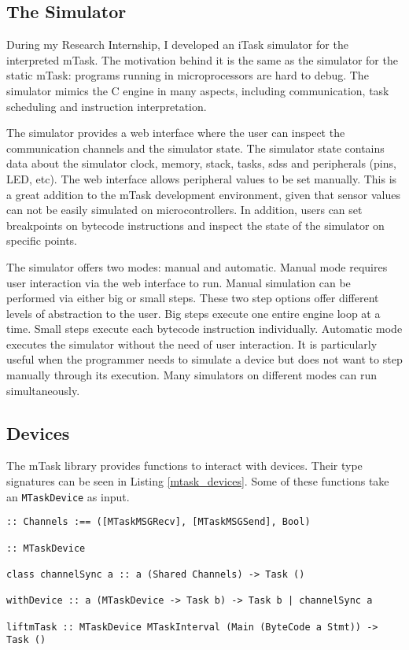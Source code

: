 \subsection{The Simulator}\label{mtask_simulator}

During my Research Internship, I developed an iTask simulator for the interpreted \gls{mTask}. The motivation behind it is the same as the simulator for the static \gls{mTask}: programs running in microprocessors are hard to debug. The simulator mimics the C engine in many aspects, including communication, task scheduling and instruction interpretation. 

The simulator provides a web interface where the user can inspect the communication channels and the simulator state. The simulator state contains data about the simulator clock, memory, stack, tasks, \acp{sds} and peripherals (pins, LED, etc). The web interface allows peripheral values to be set manually. This is a great addition to the \gls{mTask} development environment, given that sensor values can not be easily simulated on microcontrollers. In addition, users can set breakpoints on bytecode instructions and inspect the state of the simulator on specific points.

The simulator offers two modes: manual and automatic. Manual mode requires user interaction via the web interface to run. Manual simulation can be performed via either big or small steps. These two step options offer different levels of abstraction to the user. Big steps execute one entire engine loop at a time. Small steps execute each bytecode instruction individually. Automatic mode executes the simulator without the need of user interaction. It is particularly useful when the programmer needs to simulate a device but does not want to step manually through its execution. Many simulators on different modes can run simultaneously.

\subsection{Devices}\label{sec:mtask_devices}

The \gls{mTask} library provides functions to interact with devices. Their type signatures can be seen in Listing \ref{mtask_devices}. Some of these functions take an \texttt{MTaskDevice} as input. 

\begin{lstlisting}[caption=Device interaction functions,captionpos=b,label=mtask_devices]
:: Channels :== ([MTaskMSGRecv], [MTaskMSGSend], Bool)

:: MTaskDevice

class channelSync a :: a (Shared Channels) -> Task ()

withDevice :: a (MTaskDevice -> Task b) -> Task b | channelSync a

liftmTask :: MTaskDevice MTaskInterval (Main (ByteCode a Stmt)) -> Task () 
\end{lstlisting}


